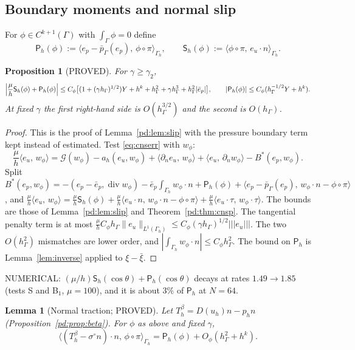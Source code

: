\documentclass[11pt,reqno]{amsart}
\theoremstyle{plain}
\newtheorem{proposition}[theorem]{Proposition}
\newtheorem{lemma}[theorem]{Lemma}
\theoremstyle{definition}
\newcommand{\hG}{h_\Gamma}
\newcommand{\Gh}{\Gamma_h}
\newcommand{\dn}{\partial_n}
\newcommand{\pbG}{\bar p_{\Gamma}}
\newcommand{\ip}[2]{\langle #1,\, #2\rangle}
\newcommand{\tnorm}[1]{|\!|\!|#1|\!|\!|}
\newcommand{\norm}[1]{\lVert #1\rVert}
\renewcommand{\div}{\operatorname{div}}
\newcommand{\Gc}{\mathcal G}
\newcommand{\Pm}{\mathsf P_h}     %
\newcommand{\Sm}{\mathsf S_h}     %
\begin{document}
\subsection{Boundary moments and normal slip}

For $\phi\in C^{k+1}(\Gamma)$ with $\int_\Gamma\phi=0$ define
\[
\Pm(\phi):=\ip{e_p-\pbG(e_p)}{\phi\circ\pi}_{\Gh},\qquad \Sm(\phi):=\ip{\phi\circ\pi}{e_u\cdot n}_{\Gh}.
\]

\begin{proposition}[PROVED]\label{misc:prop:B1}
For $\gamma\ge\gamma_2$,
\[
\Bigl|\frac\mu h\Sm(\phi)+\Pm(\phi)\Bigr|\le C_\phi\bigl[(1+(\gamma\hG)^{1/2})Y+h^k+\hG^2+\gamma\hG^3+\hG^2|\bar e_p|\bigr],
\qquad |\Pm(\phi)|\le C_\phi(\hG^{-1/2}Y+h^k).
\]
At fixed $\gamma$ the first right-hand side is $O(\hG^{3/2})$ and the second is $O(\hG)$.
\end{proposition}

\begin{proof}
This is the proof of Lemma~\ref{pd:lem:slip} with the pressure boundary term kept instead of estimated. Test \eqref{eq:cnserr} with $w_\phi$:
\[
\frac\mu h\ip{e_u}{w_\phi}=\Gc(w_\phi)-a_h(e_u,w_\phi)+\ip{\dn e_u}{w_\phi}+\ip{e_u}{\dn w_\phi}-B^\ast(e_p,w_\phi).
\]
Split $B^\ast(e_p,w_\phi)=-(e_p-\bar e_p,\div w_\phi)-\bar e_p\int_{\Gh}w_\phi\cdot n+\Pm(\phi)+\ip{e_p-\pbG(e_p)}{w_\phi\cdot n-\phi\circ\pi}$, and $\frac\mu h\ip{e_u}{w_\phi}=\frac\mu h\Sm(\phi)+\frac\mu h\ip{e_u\cdot n}{w_\phi\cdot n-\phi\circ\pi}+\frac\mu h\ip{e_u\cdot\tau}{w_\phi\cdot\tau}$. The bounds are those of Lemma~\ref{pd:lem:slip} and Theorem~\ref{pd:thm:cnsp}. The tangential penalty term is at most $\frac\mu hC_\phi\hG\norm{e_u}_{L^1(\Gh)}\le C_\phi(\gamma\hG)^{1/2}\tnorm{e_u}$. The two $O(\hG^2)$ mismatches are lower order, and $|\int_{\Gh}w_\phi\cdot n|\le C_\phi\hG^2$. The bound on $\Pm$ is Lemma~\ref{lem:inverse} applied to $\xi-\bar\xi$.
\end{proof}

NUMERICAL: $(\mu/h)\Sm(\cos\theta)+\Pm(\cos\theta)$ decays at rates $1.49\to1.85$ (tests S and B$_1$, $\mu=100$), and it is about $3\%$ of $\Pm$ at $N=64$.

\begin{lemma}[Normal traction; PROVED]\label{misc:lem:C1}
Let $T^\beta_h=D(u_h)n-p_hn$ (Proposition~\ref{pd:prop:beta}). For $\phi$ as above and fixed $\gamma$,
\[
\ip{(T^\beta_h-\sigma^\circ n)\cdot n}{\phi\circ\pi}_{\Gh}=\Pm(\phi)+O_\phi(\hG^2+h^k).
\]
\end{lemma}
\end{document}
